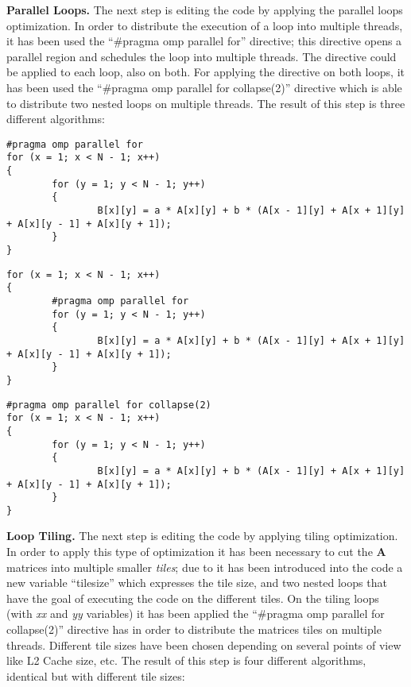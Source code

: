 \documentclass[conference]{IEEEtran}
\newcommand{\mypar}[1]{{\bf #1.}}
\begin{document}
\mypar{Parallel Loops}
The next step is editing the code by applying the parallel loops optimization. In order to distribute the execution of a loop into multiple threads, it has been used the ``#pragma omp parallel for'' \cite{omp-parallel}\cite{omp-for} directive; this directive opens a parallel region and schedules the loop into multiple threads. The directive could be applied to each loop, also on both. For applying the directive on both loops, it has been used the ``#pragma omp parallel for collapse(2)''\cite{omp-collapse} directive which is able to distribute two nested loops on multiple threads. The result of this step is three different algorithms:

\renewcommand{\lstlistingname}{Algorithm}

\begin{lstlisting}[caption= Parallel loop on X]
#pragma omp parallel for
for (x = 1; x < N - 1; x++)
{
		for (y = 1; y < N - 1; y++)
		{
				B[x][y] = a * A[x][y] + b * (A[x - 1][y] + A[x + 1][y] + A[x][y - 1] + A[x][y + 1]);
		}
}
\end{lstlisting}

\begin{lstlisting}[caption= Parallel loop on Y]
for (x = 1; x < N - 1; x++)
{
		#pragma omp parallel for
		for (y = 1; y < N - 1; y++)
		{
				B[x][y] = a * A[x][y] + b * (A[x - 1][y] + A[x + 1][y] + A[x][y - 1] + A[x][y + 1]);
		}
}
\end{lstlisting}

\begin{lstlisting}[caption= Parallel loop on X and Y]
#pragma omp parallel for collapse(2)
for (x = 1; x < N - 1; x++)
{
		for (y = 1; y < N - 1; y++)
		{
				B[x][y] = a * A[x][y] + b * (A[x - 1][y] + A[x + 1][y] + A[x][y - 1] + A[x][y + 1]);
		}
}
\end{lstlisting}

\mypar{Loop Tiling}
The next step is editing the code by applying tiling optimization. In order to apply this type of optimization it has been necessary to cut the \textbf{A} matrices into multiple smaller \textit{tiles}; due to it has been introduced into the code a new variable ``tile\textunderscore size'' which expresses the tile size, and two nested loops that have the goal of executing the code on the different tiles. On the tiling loops (with \textit{xx} and \textit{yy} variables) it has been applied the ``#pragma omp parallel for collapse(2)'' directive has in order to distribute the matrices tiles on multiple threads. Different tile sizes have been chosen depending on several points of view like L2 Cache size, etc. The result of this step is four different algorithms, identical but with different tile sizes:
\end{document}

